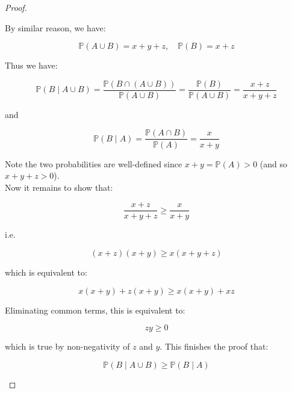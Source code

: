 \documentclass{qlnotes-export}
\begin{document}
\begin{proof}
\begin{itemize}
  By similar reason, we have:

  \[{\mathbb{P}}(A \cup B) = x + y + z,\quad{\mathbb{P}}(B) = x + z\]

  Thus we have:

  \[{\mathbb{P}}(B \mid A \cup B) = \frac{{\mathbb{P}}(B \cap (A \cup B))}{{\mathbb{P}}(A \cup B)} = \frac{{\mathbb{P}}(B)}{{\mathbb{P}}(A \cup B)} = \frac{x + z}{x + y + z}\]

  and

  \[{\mathbb{P}}(B \mid A) = \frac{{\mathbb{P}}(A \cap B)}{{\mathbb{P}}(A)} = \frac{x}{x + y}\]

  Note the two probabilities are well-defined since \(x + y = {\mathbb{P}}(A) > 0\) (and so \(x + y + z > 0\)).\\
  Now it remains to show that:

  \[\frac{x + z}{x + y + z} \geq \frac{x}{x + y}\]

  i.e.

  \[(x + z)(x + y) \geq x(x + y + z)\]

  which is equivalent to:

  \[x(x + y) + z(x + y) \geq x(x + y) + xz\]

  Eliminating common terms, this is equivalent to:

  \[zy \geq 0\]

  which is true by non-negativity of \(z\) and \(y\). This finishes the proof that:

  \[{\mathbb{P}}(B \mid A \cup B) \geq {\mathbb{P}}(B \mid A)\]
\end{itemize}

\end{proof}
\end{document}

